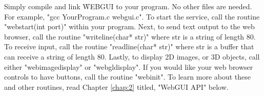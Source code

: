 Simply compile and link \f{WEBGUI} to your program. No other files are needed. For example, 
"gcc YourProgram.c webgui.c". To start the service, call the routine "webstart(int port)" within your program. 
Next, to send text output to the web browser, call the routine "writeline(char* str)" where str is a string of length 80. 
To receive input, call the routine "readline(char* str)" where str is a buffer that can receive a string of length 80.
Lastly, to display 2D images, or 3D objects, call either "webimagedisplay" or "webgldisplay".
If you would like your web browser controls to have buttons, call the routine "webinit". To learn more
about these and other routines, read Chapter \ref{chap:2} titled, "WebGUI API" below.
